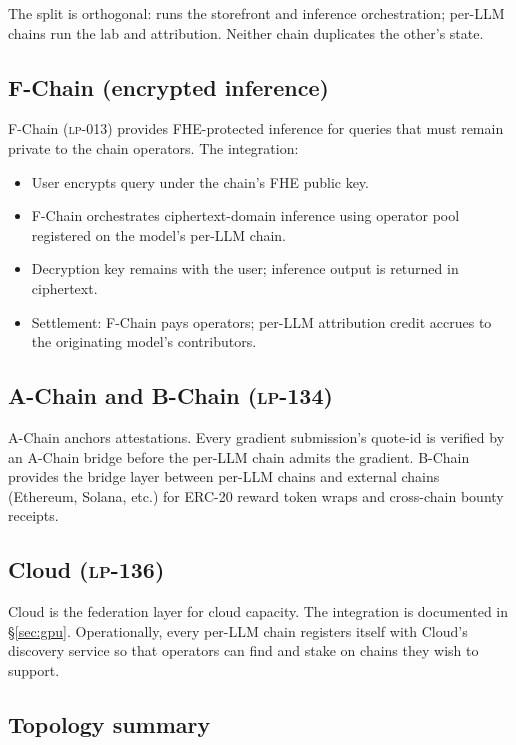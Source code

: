 The split is orthogonal: \Hanzo{} runs the storefront and inference orchestration; \Zoo{} per-LLM chains run the lab and attribution. Neither chain duplicates the other's state.

\subsection{\Lux{} F-Chain (encrypted inference)}

F-Chain (\textsc{lp-013}) provides FHE-protected inference for queries that must remain private to the chain operators. The integration:
\begin{itemize}[nosep]
\item User encrypts query under the chain's FHE public key.
\item F-Chain orchestrates ciphertext-domain inference using operator pool registered on the model's per-LLM chain.
\item Decryption key remains with the user; inference output is returned in ciphertext.
\item Settlement: F-Chain pays operators; per-LLM attribution credit accrues to the originating model's contributors.
\end{itemize}

\subsection{\Lux{} A-Chain and B-Chain (\textsc{lp-134})}

A-Chain anchors \TEE{} attestations. Every gradient submission's quote-id is verified by an A-Chain bridge before the per-LLM chain admits the gradient. B-Chain provides the bridge layer between per-LLM chains and external chains (Ethereum, Solana, etc.) for ERC-20 reward token wraps and cross-chain bounty receipts.

\subsection{\Lux{} Cloud (\textsc{lp-136})}

\Lux{} Cloud is the federation layer for cloud capacity. The integration is documented in \S\ref{sec:gpu}. Operationally, every per-LLM chain registers itself with \Lux{} Cloud's discovery service so that operators can find and stake on chains they wish to support.

\subsection{Topology summary}

